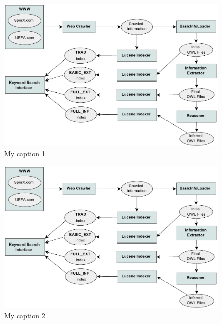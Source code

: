 \documentclass{article}
\begin{document}
\begin{figure}
\centering\includegraphics[width=5in]{fig/trans/fig1.png}
  \caption[]{My caption 1}%
\end{figure}

\begin{figure}
\centering\includegraphics[width=5in]{fig/trans/fig1.png}
  \caption{My caption 2}%
\end{figure}

\listoffigures
\end{document}
